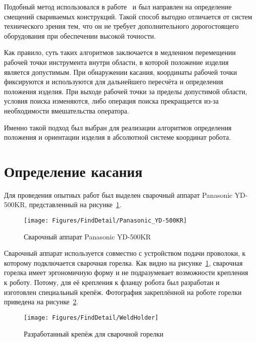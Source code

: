 Подобный метод использовался в работе~\cite{Fei_Gao_2015} и был направлен на определение смещений свариваемых конструкций.
Такой способ выгодно отличается от систем технического зрения тем, что он не требует дополнительного дорогостоящего оборудования при обеспечении высокой точности.

Как правило, суть таких алгоритмов заключается в медленном перемещении рабочей точки инструмента внутри области, в которой положение изделия является допустимым.
При обнаружении касания, координаты рабочей точки фиксируются и используются для дальнейшего пересчёта и определения положения изделия.
При выходе рабочей точки за пределы допустимой области, условия поиска изменяются, либо операция поиска прекращается из-за необходимости вмешательства оператора.

Именно такой подход был выбран для реализации алгоритмов определения положения и ориентации изделия в абсолютной системе координат робота.


\section{Определение касания}
Для проведения опытных работ был выделен сварочный аппарат Panasonic YD-500KR, представленный на рисунке~\ref{fig:FindTouch:Panasonic_YD-500KR}.

\begin{figure}[H]
    \centering
    \vspace{14pt}
    \texttt{[image: Figures/FindDetail/Panasonic\_YD-500KR]}
    \caption{Сварочный аппарат Panasonic YD-500KR}
    \label{fig:FindTouch:Panasonic_YD-500KR}
\end{figure}

Сварочный аппарат используется совместно с устройством подачи проволоки, к которому подключается сварочная горелка.
Как видно на рисунке~\ref{fig:FindTouch:Panasonic_YD-500KR}, сварочная горелка имеет эргономичную форму и не подразумевает возможности крепления к роботу.
Потому, для её крепления к фланцу робота был разработан и изготовлен специальный крепёж.
Фотография закреплённой на роботе горелки приведена на рисунке~\ref{fig:FindTouch:WeldHolder}.

\begin{figure}[H]
    \centering
    \vspace{14pt}
    \texttt{[image: Figures/FindDetail/WeldHolder]}
    \caption{Разработанный крепёж для сварочной горелки}
    \label{fig:FindTouch:WeldHolder}
\end{figure}

